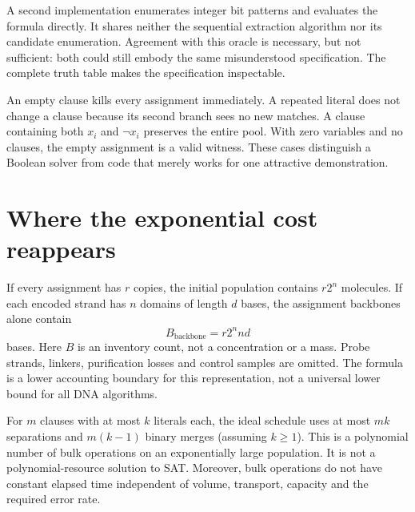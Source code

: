 
A second implementation enumerates integer bit patterns and evaluates the
formula directly. It shares neither the sequential extraction algorithm
nor its candidate enumeration. Agreement with this oracle is necessary,
but not sufficient: both could still embody the same misunderstood
specification. The complete truth table makes the specification inspectable.

\begin{center}\end{center}

An empty clause kills every assignment immediately. A repeated literal
does not change a clause because its second branch sees no new matches.
A clause containing both $x_i$ and $\neg x_i$ preserves the entire pool.
With zero variables and no clauses, the empty assignment is a valid witness.
These cases distinguish a Boolean solver from code that merely works for
one attractive demonstration.

\section{Where the exponential cost reappears}
If every assignment has $r$ copies, the initial population contains
$r2^n$ molecules. If each encoded strand has $n$ domains of length $d$
bases, the assignment backbones alone contain
\begin{equation}
 B_{\mathrm{backbone}}=r2^n nd
\end{equation}
bases. Here $B$ is an inventory count, not a concentration or a mass.
Probe strands, linkers, purification losses and control samples are omitted.
The formula is a lower accounting boundary for this representation, not
a universal lower bound for all DNA algorithms.

For $m$ clauses with at most $k$ literals each, the ideal schedule uses at
most $mk$ separations and $m(k-1)$ binary merges (assuming $k\geq1$).
This is a polynomial number of bulk operations on an exponentially large
population. It is not a polynomial-resource solution to SAT. Moreover, bulk
operations do not have constant elapsed time independent of volume,
transport, capacity and the required error rate.

